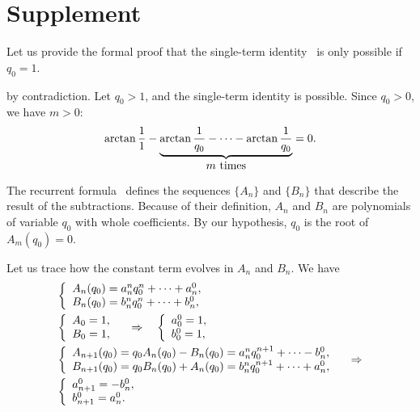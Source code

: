 \documentclass[draft, 10pt]{article} %
\def\fact#1{Fact~\ref{#1}}
\begin{document}
\section{Supplement}

\noindent{\bf \fact{nosingle}.\/} Let us provide the formal proof that
the single-term identity~ is only possible if $q_0=1$.

 by contradiction. Let $q_0>1$, and the single-term identity is possible.
Since $q_0>0$, we have $m>0$:
$$
\arctan \dfrac{1}{1} - \underbrace{\arctan \dfrac{1}{q_0} - \dots - \arctan \dfrac{1}{q_0}}_{\hbox{$m$ times}} = 0.
$$

The recurrent formula~ defines the sequences $\{ A_n \}$ and $\{ B_n \}$ that
describe the result of the subtractions.
Because of their definition, $A_n$ and $B_n$ are polynomials of variable $q_0$
with whole coefficients. By our hypothesis, $q_0$ is the root of $A_m(q_0)=0$.

Let us trace how the constant term evolves in $A_n$ and $B_n$.
We have
$$
\begin{array}{l}
%
\left\{\begin{array}{l}
A_n(q_0) = a_n^n q_0^n + \dots + a_n^0, \\
B_n(q_0) = b_n^n q_0^n + \dots + b_n^0,
\end{array}\right. \\[1em]
%
\left\{\begin{array}{l}
A_0=1, \\
B_0=1,
\end{array}\right.
\quad\ergo\quad
\left\{\begin{array}{l}
a_0^0 = 1, \\
b_0^0 = 1,
\end{array}\right. \\[1em]
%
\left\{\begin{array}{l}
A_{n+1}(q_0) = q_0 A_n(q_0) - B_n(q_0) = a_n^n q_0^{n+1} + \dots - b_n^0, \\
B_{n+1}(q_0) = q_0 B_n(q_0) + A_n(q_0) = b_n^n q_0^{n+1} + \dots + a_n^0,
\end{array}\right.  \quad\ergo \\[1em]
%
\left\{\begin{array}{l}
a_{n+1}^0 = - b_n^0, \\
b_{n+1}^0 = a_n^0.
\end{array}\right.
%
\end{array}
$$
\end{document}
